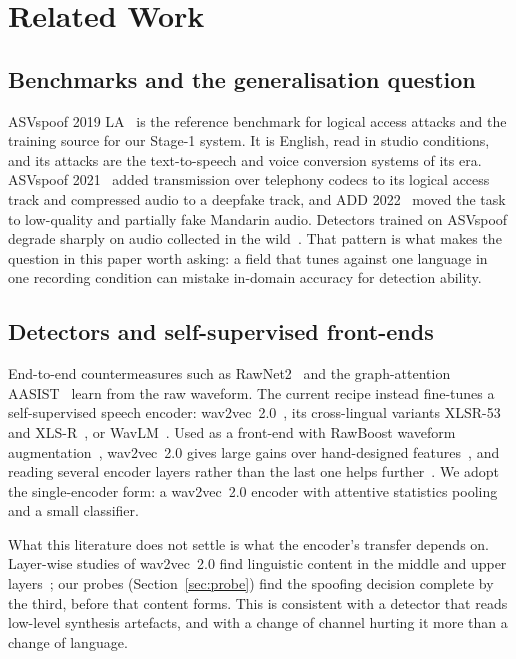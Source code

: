 \section{Related Work}
\label{sec:related}

\subsection{Benchmarks and the generalisation question}

ASVspoof 2019 LA~\cite{todisco2019asvspoof} is the reference benchmark for logical
access attacks and the training source for our Stage-1 system. It is English, read
in studio conditions, and its attacks are the text-to-speech and voice conversion
systems of its era. ASVspoof 2021~\cite{liu2023asvspoof2021} added transmission over
telephony codecs to its logical access track and compressed audio to a deepfake
track, and ADD 2022~\cite{yi2022add} moved the task to low-quality and partially fake
Mandarin audio. Detectors trained on ASVspoof degrade sharply on audio collected in
the wild~\cite{muller2022generalize}. That pattern is what makes the question in this
paper worth asking: a field that tunes against one language in one recording
condition can mistake in-domain accuracy for detection ability.

\subsection{Detectors and self-supervised front-ends}

End-to-end countermeasures such as RawNet2~\cite{tak2021rawnet2} and the
graph-attention AASIST~\cite{jung2022aasist} learn from the raw waveform. The current
recipe instead fine-tunes a self-supervised speech encoder: wav2vec~2.0~\cite{baevski2020wav2vec},
its cross-lingual variants XLSR-53~\cite{conneau2021xlsr} and XLS-R~\cite{babu2022xlsr},
or WavLM~\cite{chen2022wavlm}. Used as a front-end with RawBoost waveform
augmentation~\cite{tak2022rawboost}, wav2vec~2.0 gives large gains over hand-designed
features~\cite{tak2022wav2vec}, and reading several encoder layers rather than the
last one helps further~\cite{zhang2024sls}. We adopt the single-encoder form: a
wav2vec~2.0 encoder with attentive statistics pooling~\cite{okabe2018attentive} and a
small classifier.

What this literature does not settle is what the encoder's transfer depends on.
Layer-wise studies of wav2vec~2.0 find linguistic content in the middle and upper
layers~\cite{pasad2021layerwise}; our probes (Section~\ref{sec:probe}) find the
spoofing decision complete by the third, before that content forms. This is
consistent with a detector that reads low-level synthesis artefacts, and with a
change of channel hurting it more than a change of language.


